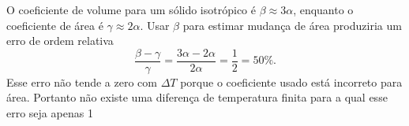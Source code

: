 O coeficiente de volume para um sólido isotrópico é $\beta\approx3\alpha$, enquanto o coeficiente de área é $\gamma\approx2\alpha$. Usar $\beta$ para estimar mudança de área produziria um erro de ordem relativa
\[
\frac{\beta-\gamma}{\gamma}=\frac{3\alpha-2\alpha}{2\alpha}=\frac12 = 50\%.
\]
Esse erro não tende a zero com $\Delta T$ porque o coeficiente usado está incorreto para área. Portanto não existe uma diferença de temperatura finita para a qual esse erro seja apenas 1%